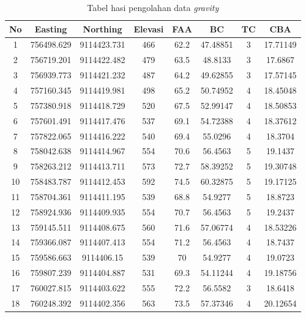 \centering
\begin{longtable}{cccccccc}
\caption{Tabel hasi pengolahan data \textit{gravity}}
\label{tab:TabelGrav}
\endfirsthead
\endhead
\hline
\hline
No   & Easting & Northing & Elevasi & FAA   & BC       & TC & CBA      \\ \hline
1    & 756498.629      & 9114423.731      & 466     & 62.2  & 47.48851 & 3  & 17.71149 \\
2    & 756719.201      & 9114422.482      & 479     & 63.5  & 48.8133  & 3  & 17.6867  \\
3    & 756939.773      & 9114421.232      & 487     & 64.2  & 49.62855 & 3  & 17.57145 \\
4    & 757160.345      & 9114419.981      & 498     & 65.2  & 50.74952 & 4  & 18.45048 \\
5    & 757380.918      & 9114418.729      & 520     & 67.5  & 52.99147 & 4  & 18.50853 \\
6    & 757601.491      & 9114417.476      & 537     & 69.1  & 54.72388 & 4  & 18.37612 \\
7    & 757822.065      & 9114416.222      & 540     & 69.4  & 55.0296  & 4  & 18.3704  \\
8    & 758042.638      & 9114414.967      & 554     & 70.6  & 56.4563  & 5  & 19.1437  \\
9    & 758263.212      & 9114413.711      & 573     & 72.7  & 58.39252 & 5  & 19.30748 \\
10   & 758483.787      & 9114412.453      & 592     & 74.5  & 60.32875 & 5  & 19.17125 \\
11   & 758704.361      & 9114411.195      & 539     & 68.8  & 54.9277  & 5  & 18.8723  \\
12   & 758924.936      & 9114409.935      & 554     & 70.7  & 56.4563  & 5  & 19.2437  \\
13   & 759145.511      & 9114408.675      & 560     & 71.6  & 57.06774 & 4  & 18.53226 \\
14   & 759366.087      & 9114407.413      & 554     & 71.2  & 56.4563  & 4  & 18.7437  \\
15   & 759586.663      & 9114406.15       & 539     & 70    & 54.9277  & 4  & 19.0723  \\
16   & 759807.239      & 9114404.887      & 531     & 69.3  & 54.11244 & 4  & 19.18756 \\
17   & 760027.815      & 9114403.622      & 555     & 72.2  & 56.5582  & 3  & 18.6418  \\
18   & 760248.392      & 9114402.356      & 563     & 73.5  & 57.37346 & 4  & 20.12654 \\

\end{longtable}
